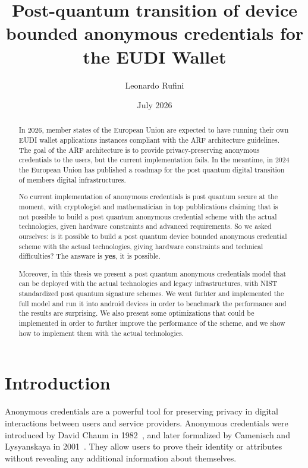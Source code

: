 \documentclass{article}
\title{Post-quantum transition of device bounded anonymous credentials for the EUDI Wallet}
\author{Leonardo Rufini}
\date{July 2026}
\begin{document}
\maketitle

\begin{abstract}
\label{abstract}
In 2026, member states of the European Union are expected to have running
their own EUDI wallet applications instances compliant with the ARF
architecture guidelines. The goal of the ARF architecture is to provide privacy-preserving 
anonymous credentials to the users, but the current implementation fails.
In the meantime, in 2024 the European Union has published a roadmap for the post 
quantum digital transition of members digital infrastructures.

No current implementation of anonymous credentials is post quantum secure at the moment,
with cryptologist and mathematician in top pubblications claiming that is not possible to
build a post quantum anonymous credential scheme with the actual technologies, given
hardware constraints and advanced requirements. So we asked ourselves: is it 
possible to build a post quantum device bounded anonymous credential scheme with the actual technologies, 
giving hardware constraints and technical difficulties? The answare is \textbf{yes}, it is
possible. 

Moreover, in this thesis we present a post quantum anonymous credentials model 
that can be deployed with the actual technologies and legacy infrastructures, with 
NIST standardized post quantum signature schemes. We went furhter and implemented the full
model and run it into android devices in order to benchmark the performance and the results
are surprising. We also present some optimizations that could be implemented in order to 
further improve the performance of the scheme, and we show how to implement them with the 
actual technologies.

\end{abstract}

\listoffigures
\listoftables
\lstlistoflistings
\tableofcontents

\section{Introduction}
\label{introduction}
Anonymous credentials are a powerful tool for preserving privacy in digital interactions
between users and service providers. Anonymous credentials were introduced by David Chaum in 1982~\cite{chaum1982blind}, 
and later formalized by Camenisch and Lysyanskaya in 2001~\cite{camenisch2001efficient,sigschemes2004}. They allow users to prove their identity or 
attributes without revealing any additional information about themselves. 
\end{document}
